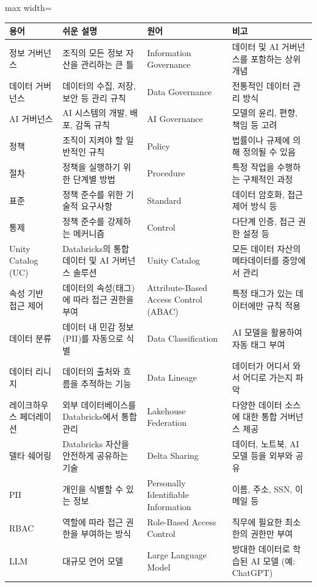 \documentclass[11pt,a4paper]{article}
\theoremstyle{definition}
\begin{document}
\begin{adjustbox}{max width=\textwidth}
\begin{tabular}{llll}
\toprule
\textbf{용어} & \textbf{쉬운 설명} & \textbf{원어} & \textbf{비고} \\
\midrule
정보 거버넌스 & 조직의 모든 정보 자산을 관리하는 큰 틀 & Information Governance & 데이터 및 AI 거버넌스를 포함하는 상위 개념 \\
데이터 거버넌스 & 데이터의 수집, 저장, 보안 등 관리 규칙 & Data Governance & 전통적인 데이터 관리 방식 \\
AI 거버넌스 & AI 시스템의 개발, 배포, 감독 규칙 & AI Governance & 모델의 윤리, 편향, 책임 등 고려 \\
정책 & 조직이 지켜야 할 일반적인 규칙 & Policy & 법률이나 규제에 의해 정의될 수 있음 \\
절차 & 정책을 실행하기 위한 단계별 방법 & Procedure & 특정 작업을 수행하는 구체적인 과정 \\
표준 & 정책 준수를 위한 기술적 요구사항 & Standard & 데이터 암호화, 접근 제어 방식 등 \\
통제 & 정책 준수를 강제하는 메커니즘 & Control & 다단계 인증, 접근 권한 설정 등 \\
Unity Catalog (UC) & Databricks의 통합 데이터 및 AI 거버넌스 솔루션 & Unity Catalog & 모든 데이터 자산의 메타데이터를 중앙에서 관리 \\
속성 기반 접근 제어 & 데이터의 속성(태그)에 따라 접근 권한을 부여 & Attribute-Based Access Control (ABAC) & 특정 태그가 있는 데이터에만 규칙 적용 \\
데이터 분류 & 데이터 내 민감 정보(PII)를 자동으로 식별 & Data Classification & AI 모델을 활용하여 자동 태그 부여 \\
데이터 리니지 & 데이터의 출처와 흐름을 추적하는 기능 & Data Lineage & 데이터가 어디서 와서 어디로 가는지 파악 \\
레이크하우스 페더레이션 & 외부 데이터베이스를 Databricks에서 통합 관리 & Lakehouse Federation & 다양한 데이터 소스에 대한 통합 거버넌스 제공 \\
델타 쉐어링 & Databricks 자산을 안전하게 공유하는 기술 & Delta Sharing & 데이터, 노트북, AI 모델 등을 외부와 공유 \\
PII & 개인을 식별할 수 있는 정보 & Personally Identifiable Information & 이름, 주소, SSN, 이메일 등 \\
RBAC & 역할에 따라 접근 권한을 부여하는 방식 & Role-Based Access Control & 직무에 필요한 최소한의 권한만 부여 \\
LLM & 대규모 언어 모델 & Large Language Model & 방대한 데이터로 학습된 AI 모델 (예: ChatGPT) \\
\bottomrule
\end{tabular}
\end{adjustbox}
\label{tab:glossary}
\end{document}
